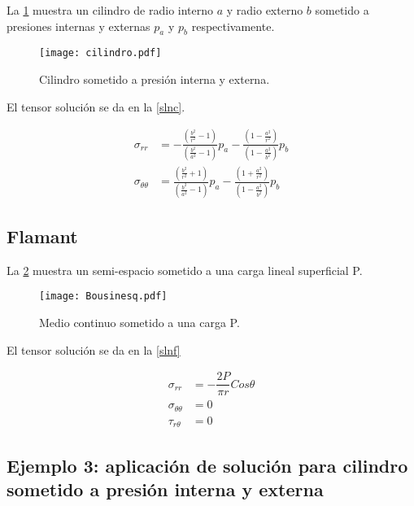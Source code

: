 \documentclass[../notas medios.tex]{subfiles}
\begin{document}
La \cref{cilindro} muestra un cilindro de radio interno $a$ y radio externo $b$ sometido a presiones internas y externas $p_a$ y $p_b$ respectivamente. 

\begin{figure}[H]
\centering
	\texttt{[image: cilindro.pdf]}
	\caption{Cilindro sometido a presión interna y externa.}
	\label{cilindro}
\end{figure}

El tensor solución se da en la \cref{slnc}.

\begin{equation}
\begin{split}
{\sigma _{rr}} & =  - \frac{{\left( {\frac{{{b^2}}}{{{r^2}}} - 1} \right)}}{{\left( {\frac{{{b^2}}}{{{a^2}}} - 1} \right)}}{p_a} - \frac{{\left( {1 - \frac{{{a^2}}}{{{r^2}}}} \right)}}{{\left( {1 - \frac{{{a^2}}}{{{b^2}}}} \right)}}{p_b} \\
{\sigma _{\theta \theta }} & = \frac{{\left( {\frac{{{b^2}}}{{{r^2}}} + 1} \right)}}{{\left( {\frac{{{b^2}}}{{{a^2}}} - 1} \right)}}{p_a} - \frac{{\left( {1 + \frac{{{a^2}}}{{{r^2}}}} \right)}}{{\left( {1 - \frac{{{a^2}}}{{{b^2}}}} \right)}}{p_b}
\end{split}
\label{slnc}
\end{equation}

\subsection*{Flamant}

La \cref{Flamant} muestra un semi-espacio sometido a una carga lineal superficial P. 

\begin{figure}[H]
\centering
	\texttt{[image: Bousinesq.pdf]}
	\caption{Medio continuo sometido a una carga P.}
	\label{Flamant}
\end{figure}

El tensor solución se da en la \cref{slnf}

\begin{equation}
\begin{split}
{ \sigma_{rr}} & = -\dfrac{2P}{\pi r} Cos \theta \\
{\sigma_{\theta\theta}}  &= 0\\
{\tau_{r\theta}}&= 0
\end{split}
\label{slnf}
\end{equation}

\subsection*{Ejemplo 3: aplicación de solución para cilindro sometido a presión interna y externa}
\end{document}
